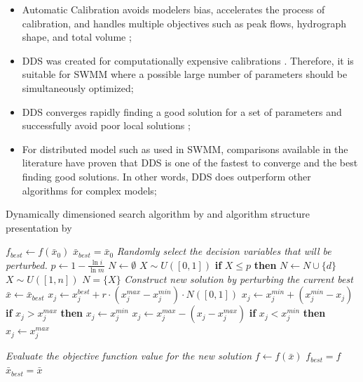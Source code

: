 \begin{itemize}
    \item Automatic Calibration avoids modelers bias, accelerates the process of calibration, and handles multiple objectives such as peak flows, hydrograph shape, and total volume \cite{dent2004};
    \item DDS was created for computationally expensive calibrations \cite{arsenault2013}. Therefore, it is suitable for SWMM where a possible large number of parameters should be simultaneously optimized;
    \item DDS converges rapidly finding a good solution for a set of parameters and successfully avoid poor local solutions \cite{tolson2007};
    \item For distributed model such as used in SWMM, comparisons available in the literature have proven that DDS is one of the fastest to converge and the best finding good solutions. In other words, DDS does outperform other algorithms for complex models\cite{tolson2007,wallner2012,arsenault2013};
\end{itemize}

\begin{algorithm}
	\caption{Dynamically dimensioned search algorithm by \citet{tolson2007} and algorithm structure presentation by \citet{Sunela2017}}
	\label{alg:dds}
	\begin{algorithmic}
		\State $f_{best} \gets f(\bar{x}_0)$
		\State $\bar{x}_{best} = \bar{x}_0$
		\State \textit{Randomly select the decision variables that will be perturbed.}
		\State $p \gets 1 - \frac{\ln{i}}{\ln{m}}$
		\State $N \gets \emptyset$
		\State $X \sim U([0, 1])$
		\State \textbf{if} $X \leq p$ \textbf{then}	$N \gets N \cup \{d\}$
		\EndFor
		\State $X \sim U([1, n])$
		\State $N = \{ X \}$
		\EndIf
		\State \textit{Construct new solution by perturbing the current best}
		\State $\bar{x} \gets \bar{x}_{best}$
		\State $x_j \gets x^{best}_j + r \cdot (x^{max}_j - x^{min}_j) \cdot N([0, 1])$		
		\State $x_j \gets x^{min}_j + (x^{min}_j - x_j)$
		\State \textbf{if} $x_j > x^{max}_j$ \textbf{then} $x_j \gets x^{min}_j$
		\State $x_j \gets x^{max}_j - (x_j - x^{max}_j)$
		\State \textbf{if} $x_j < x^{min}_j$ \textbf{then} $x_j \gets x^{max}_j$
		\EndIf
		\EndFor
		
		\State \textit{Evaluate the objective function value for the new solution}
		\State $f \gets f(\bar{x})$
		\State $f_{best} = f$
		\State $\bar{x}_{best} = \bar{x}$
		\EndIf
		\EndFor
	\end{algorithmic}	
\end{algorithm}



